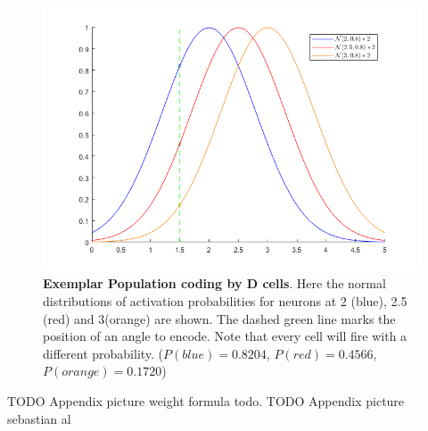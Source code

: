 \begin{figure}[tb]
	\centering
	\includegraphics[width=0.7\linewidth]{figures/ModelSebastian/popCode}
	\caption[Population Coding]{\textbf{Exemplar Population coding by D cells}. Here the normal distributions of activation probabilities for neurons at 2 (blue), 2.5 (red) and 3(orange) are shown. The dashed green line marks the position of an angle to encode. Note that every cell will fire with a different probability. ($P(blue)=0.8204$, $P(red)=0.4566$, $P(orange)=0.1720$)   }
	\label{fig:popCode}
\end{figure}




TODO Appendix picture weight formula todo. 
TODO Appendix picture sebastian al

